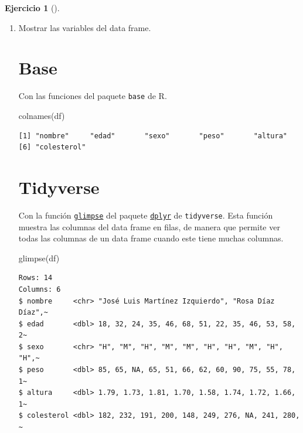 \documentclass[
  a4paper,
]{scrreport}
\newenvironment{Shaded}{\begin{snugshade}}{\end{snugshade}}
\newcommand{\FunctionTok}[1]{\textcolor[rgb]{0.28,0.35,0.67}{#1}}
\newcommand{\NormalTok}[1]{\textcolor[rgb]{0.00,0.23,0.31}{#1}}
\theoremstyle{definition}
\newtheorem{exercise}{Ejercicio}[chapter]
\theoremstyle{remark}
\begin{document}
\begin{exercise}[]
\begin{enumerate}
\begin{tcolorbox}
  \end{tcolorbox}
\item
  Mostrar las variables del data frame.

  \begin{tcolorbox}[enhanced jigsaw, colframe=quarto-callout-tip-color-frame, toprule=.15mm, bottomtitle=1mm, breakable, opacitybacktitle=0.6, toptitle=1mm, colback=white, bottomrule=.15mm, title=\textcolor{quarto-callout-tip-color}{\faLightbulb}\hspace{0.5em}{Solución}, arc=.35mm, left=2mm, titlerule=0mm, rightrule=.15mm, coltitle=black, leftrule=.75mm, opacityback=0, colbacktitle=quarto-callout-tip-color!10!white]

  \section{Base}

  Con las funciones del paquete \texttt{base} de R.

\begin{Shaded}
\begin{Highlighting}[]
\FunctionTok{colnames}\NormalTok{(df)}
\end{Highlighting}
\end{Shaded}

\begin{verbatim}
[1] "nombre"     "edad"       "sexo"       "peso"       "altura"    
[6] "colesterol"
\end{verbatim}

  \section{Tidyverse}

  Con la función
  \href{https://dplyr.tidyverse.org/reference/glimpse.html?q=read_csv\#undefined}{\texttt{glimpse}}
  del paquete
  \href{https://dplyr.tidyverse.org/index.html}{\texttt{dplyr}} de
  \texttt{tidyverse}. Esta función muestra las columnas del data frame
  en filas, de manera que permite ver todas las columnas de un data
  frame cuando este tiene muchas columnas.

\begin{Shaded}
\begin{Highlighting}[]
\FunctionTok{glimpse}\NormalTok{(df)}
\end{Highlighting}
\end{Shaded}

\begin{verbatim}
Rows: 14
Columns: 6
$ nombre     <chr> "José Luis Martínez Izquierdo", "Rosa Díaz Díaz",~
$ edad       <dbl> 18, 32, 24, 35, 46, 68, 51, 22, 35, 46, 53, 58, 2~
$ sexo       <chr> "H", "M", "H", "M", "M", "H", "H", "M", "H", "H",~
$ peso       <dbl> 85, 65, NA, 65, 51, 66, 62, 60, 90, 75, 55, 78, 1~
$ altura     <dbl> 1.79, 1.73, 1.81, 1.70, 1.58, 1.74, 1.72, 1.66, 1~
$ colesterol <dbl> 182, 232, 191, 200, 148, 249, 276, NA, 241, 280, ~
\end{verbatim}


\end{tcolorbox}
\end{enumerate}
\end{exercise}
\end{document}
